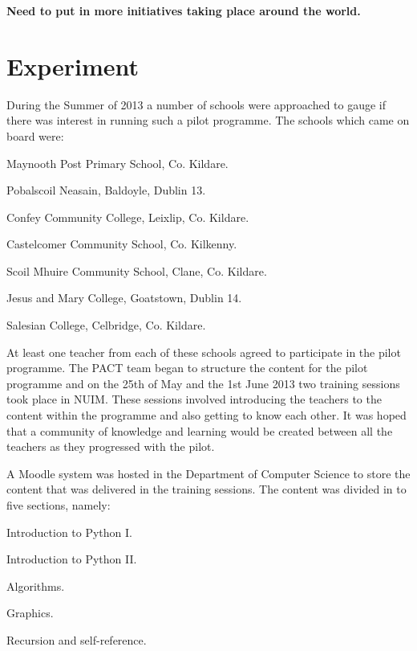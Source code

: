 \documentclass[a4paper]{article}
\begin{document}
\textbf{Need to put in more initiatives taking place around the world.}\\

\section{Experiment}
During the Summer of 2013 a number of schools were approached to gauge if there was interest in running such a pilot programme. The schools which came on board were:
\begin{compactitem}
  \item Maynooth Post Primary School, Co. Kildare.
  \item Pobalscoil Neasain, Baldoyle, Dublin 13.
  \item Confey Community College, Leixlip, Co. Kildare.
  \item Castelcomer Community School, Co. Kilkenny.
  \item Scoil Mhuire Community School, Clane, Co. Kildare.
  \item Jesus and Mary College, Goatstown, Dublin 14.
  \item Salesian College, Celbridge, Co. Kildare.
\end{compactitem}

At least one teacher from each of these schools agreed to participate in the pilot programme. The PACT team began to structure the content for the pilot programme and on the 25th of May and the 1st June 2013 two training sessions took place in NUIM. These sessions involved introducing the teachers to the content within the programme and also getting to know each other. It was hoped that a community of knowledge and learning would be created between all the teachers as they progressed with the pilot.

A Moodle system was hosted in the Department of Computer Science to store the content that was delivered in the training sessions. The content was divided in to five sections, namely:

\begin{compactenum}
  \item Introduction to Python I.
  \item Introduction to Python II.
  \item Algorithms.
  \item Graphics.
  \item Recursion and self-reference.
\end{compactenum}
\end{document}
